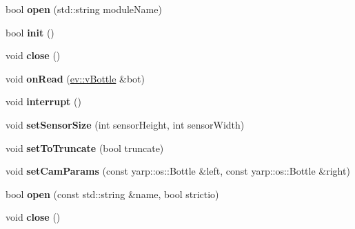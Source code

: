\begin{DoxyCompactItemize}
\item 
bool {\bfseries open} (std\+::string module\+Name)\hypertarget{classEventBottleManager_a82d3237530dcc455f3ceae4e1db4f6df}{}\label{classEventBottleManager_a82d3237530dcc455f3ceae4e1db4f6df}

\item 
bool {\bfseries init} ()\hypertarget{classEventBottleManager_af4d71177a30fdd8fc40485b91abdae10}{}\label{classEventBottleManager_af4d71177a30fdd8fc40485b91abdae10}

\item 
void {\bfseries close} ()\hypertarget{classEventBottleManager_aa155dc6f20728e9f7ff13abf720ea6b8}{}\label{classEventBottleManager_aa155dc6f20728e9f7ff13abf720ea6b8}

\item 
void {\bfseries on\+Read} (\hyperlink{classev_1_1vBottle}{ev\+::v\+Bottle} \&bot)\hypertarget{classEventBottleManager_aa848144d06e1970fb3c0482da838f078}{}\label{classEventBottleManager_aa848144d06e1970fb3c0482da838f078}

\item 
void {\bfseries interrupt} ()\hypertarget{classEventBottleManager_a15152f9daa40714334c2da3871f959a9}{}\label{classEventBottleManager_a15152f9daa40714334c2da3871f959a9}

\item 
void {\bfseries set\+Sensor\+Size} (int sensor\+Height, int sensor\+Width)\hypertarget{classEventBottleManager_a756fda9127e0fc1f8b3781f905f6d28a}{}\label{classEventBottleManager_a756fda9127e0fc1f8b3781f905f6d28a}

\item 
void {\bfseries set\+To\+Truncate} (bool truncate)\hypertarget{classEventBottleManager_a60a4601946a56237640844c40d769fa1}{}\label{classEventBottleManager_a60a4601946a56237640844c40d769fa1}

\item 
void {\bfseries set\+Cam\+Params} (const yarp\+::os\+::\+Bottle \&left, const yarp\+::os\+::\+Bottle \&right)\hypertarget{classEventBottleManager_a1c35cf25905e02c088fbf5de3c24c6e4}{}\label{classEventBottleManager_a1c35cf25905e02c088fbf5de3c24c6e4}

\item 
bool {\bfseries open} (const std\+::string \&name, bool strictio)\hypertarget{classEventBottleManager_ae8cad433fe1b5203bf3a7d03f5ed4639}{}\label{classEventBottleManager_ae8cad433fe1b5203bf3a7d03f5ed4639}

\item 
void {\bfseries close} ()\hypertarget{classEventBottleManager_aa155dc6f20728e9f7ff13abf720ea6b8}{}\label{classEventBottleManager_aa155dc6f20728e9f7ff13abf720ea6b8}


\end{DoxyCompactItemize}
